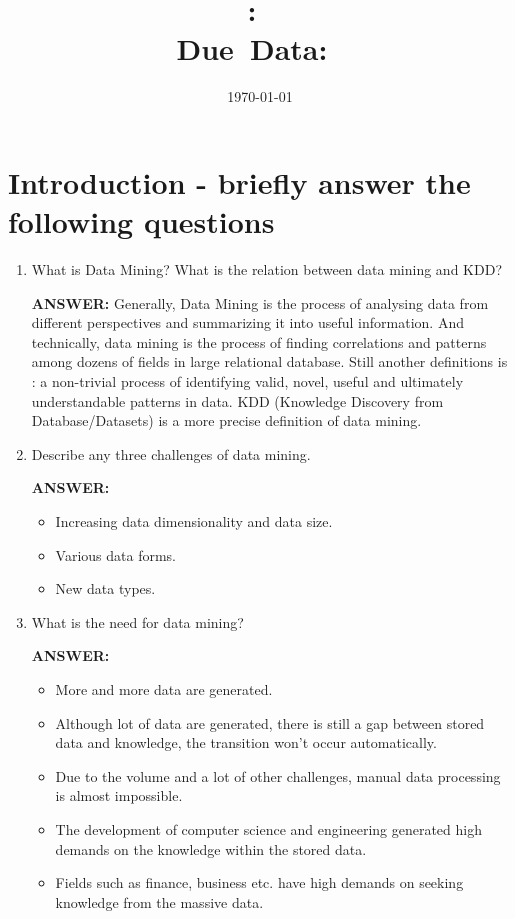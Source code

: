 \documentclass{article}
\title{\textmd{\textbf{\hmwkClass:\ 
      \hmwkTitle}}\\\normalsize\small{Due\ Data:\
    \hmwkDueDate}}
\date{\today}
\author{\textbf{\hmwkAuthorName}}
\begin{document}
\maketitle

\section{Introduction - briefly answer the following questions}
\begin{enumerate}
\item What is Data Mining? What is the relation between data mining and
  KDD? 

\textbf{ANSWER:} Generally, Data Mining is the process of analysing data
from different perspectives and summarizing it into useful
information. And technically, data mining is the process of finding
correlations and patterns among dozens of fields in large relational
database. Still another definitions is : a non-trivial process of
identifying valid, novel, useful and ultimately understandable patterns
in data. KDD (Knowledge Discovery from Database/Datasets) is a more
precise definition of data mining. 
\item Describe any three challenges of data mining. 

\textbf{ANSWER:} 
\begin{itemize}
\item Increasing data dimensionality and data size. 
\item Various data forms. 
\item New data types. 
\end{itemize}

\item What is the need for data mining? 

\textbf{ANSWER:} 
\begin{itemize}
\item More and more data are generated. 
\item Although lot of data are generated, there is still a gap between
  stored data and knowledge, the transition won't occur automatically. 
\item Due to the volume and a lot of other challenges, manual data
  processing is almost impossible. 
\item The development of computer science and engineering generated
  high demands on the knowledge within the stored data. 
\item Fields such as finance, business etc. have high demands on seeking
  knowledge from the massive data. 
\end{itemize}

\end{enumerate}
\end{document}
